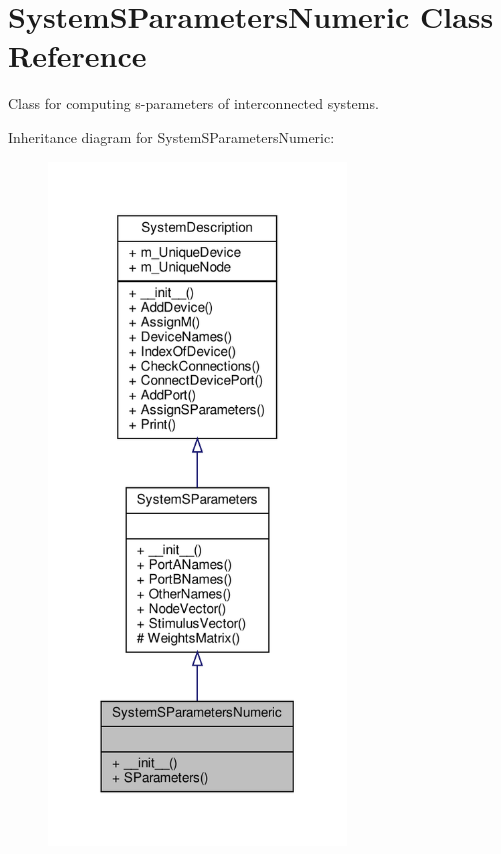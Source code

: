 \hypertarget{classSignalIntegrity_1_1SystemDescriptions_1_1SystemSParametersNumeric_1_1SystemSParametersNumeric}{}\section{System\+S\+Parameters\+Numeric Class Reference}
\label{classSignalIntegrity_1_1SystemDescriptions_1_1SystemSParametersNumeric_1_1SystemSParametersNumeric}


Class for computing s-\/parameters of interconnected systems.  




Inheritance diagram for System\+S\+Parameters\+Numeric\+:\nopagebreak
\begin{figure}[H]
\begin{center}
\leavevmode
\includegraphics[width=224pt]{classSignalIntegrity_1_1SystemDescriptions_1_1SystemSParametersNumeric_1_1SystemSParametersNumeric__inherit__graph}
\end{center}
\end{figure}


